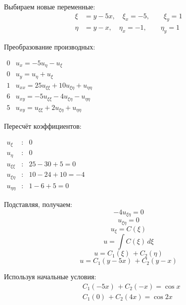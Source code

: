\documentclass[a4paper,12pt]{article}
\begin{document}
Выбираем новые переменные:
\begin{align*}
    \xi &= y - 5x, \quad \xi_x = -5,  \quad \quad \xi_y = 1 \\
    \eta &= y - x, \quad \eta_x =- 1,  \quad \quad \eta_y = 1
\end{align*}

Преобразование производных:
\begin{flushleft}
\(
\begin{array}{r|l}
0 & u_x = -5u_{\eta} - u_{\xi} \\
0 & u_y = u_{\eta} + u_{\xi} \\
1 & u_{xx} = 25 u_{\xi\xi} + 10u_{\xi\eta} + u_{\eta\eta}\\
6 & u_{xy} = -5 u_{\xi\xi} - 4u_{\xi\eta} - u_{\eta\eta}\\
5 & u_{xy} = u_{\xi\xi} + 2 u_{\xi\eta}+u_{\eta\eta}
\end{array}
\)
\end{flushleft}

Пересчёт коэффициентов:
\begin{flushleft}
\(
\begin{array}{rcl}
u_{\xi} & : & 0 \\
u_{\eta} & : & 0 \\
u_{\xi\xi} & : & 25 - 30 + 5 = 0\\
u_{\xi\eta} & : & 10 -24 + 10 = -4\\
u_{\eta\eta} & : &  1 - 6 + 5 = 0
\end{array}
\)
\end{flushleft}

Подставляя, получаем:
\begin{equation*}
    -4u_{\xi\eta} = 0
\end{equation*}
\begin{equation*}
    u_{\xi\eta} = 0
\end{equation*}
\begin{equation*}
    u_{\xi} = C(\xi)
\end{equation*}
\begin{equation*}
    u = \int C(\xi) \, d\xi
\end{equation*}
\begin{equation*}
    u = C_1(\xi) \, + C_2(\eta)
\end{equation*}
\begin{equation*}
    u = C_1(y-5x) \, + C_2(y-x)
\end{equation*}

Используя начальные условия:
\begin{align*}
    &C_1(-5x) \, + C_2(-x) = \cos x \\
    &C_1(0) \, + C_2(4x) = \cos 2x
\end{align*}
\end{document}
